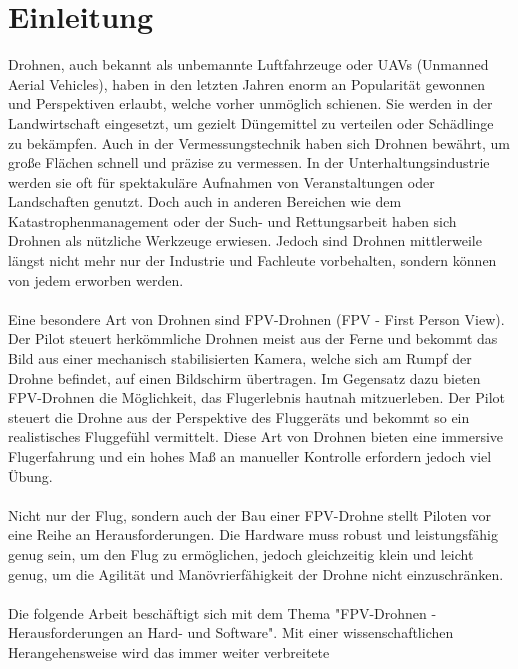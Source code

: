 
\section[Einleitung]{Einleitung}
    Drohnen, auch bekannt als unbemannte Luftfahrzeuge oder UAVs (Unmanned Aerial Vehicles),
    haben in den letzten Jahren enorm an Popularität gewonnen und Perspektiven erlaubt, welche
    vorher unmöglich schienen. Sie werden in der Landwirtschaft eingesetzt, um gezielt Düngemittel
    zu verteilen oder Schädlinge zu bekämpfen. Auch in der Vermessungstechnik haben sich Drohnen
    bewährt, um große Flächen schnell und präzise zu vermessen\cite{TheSkyistheLimit?}. In der Unterhaltungsindustrie werden
    sie oft für spektakuläre Aufnahmen von Veranstaltungen oder Landschaften genutzt. Doch
    auch in anderen Bereichen wie dem Katastrophenmanagement oder der Such- und Rettungsarbeit
    haben sich Drohnen als nützliche Werkzeuge erwiesen. Jedoch sind Drohnen mittlerweile
    längst nicht mehr nur der Industrie und Fachleute vorbehalten, sondern können von jedem
    erworben werden.\\ 
    \\
    Eine besondere Art von Drohnen sind FPV-Drohnen (FPV - First Person View). Der Pilot
    steuert herkömmliche Drohnen meist aus der Ferne und bekommt das Bild aus einer mechanisch
    stabilisierten Kamera, welche sich am Rumpf der Drohne befindet, auf einen Bildschirm
    übertragen. Im Gegensatz dazu bieten FPV-Drohnen die Möglichkeit, das Flugerlebnis hautnah
    mitzuerleben. Der Pilot steuert die Drohne aus der Perspektive des Fluggeräts und bekommt
    so ein realistisches Fluggefühl vermittelt. Diese Art von Drohnen bieten eine immersive
    Flugerfahrung und ein hohes Maß an manueller Kontrolle erfordern jedoch viel Übung. \\
    \\
    Nicht nur der Flug, sondern auch der Bau einer FPV-Drohne stellt Piloten vor eine Reihe
    an Herausforderungen. Die Hardware muss robust und leistungsfähig genug sein, um den
    Flug zu ermöglichen, jedoch gleichzeitig klein und leicht genug, um die Agilität und
    Manövrierfähigkeit der Drohne nicht einzuschränken.\\
    \\
    Die folgende Arbeit beschäftigt sich mit dem Thema "FPV-Drohnen - Herausforderungen an Hard- und
    Software". Mit einer wissenschaftlichen Herangehensweise wird das immer weiter verbreitete
